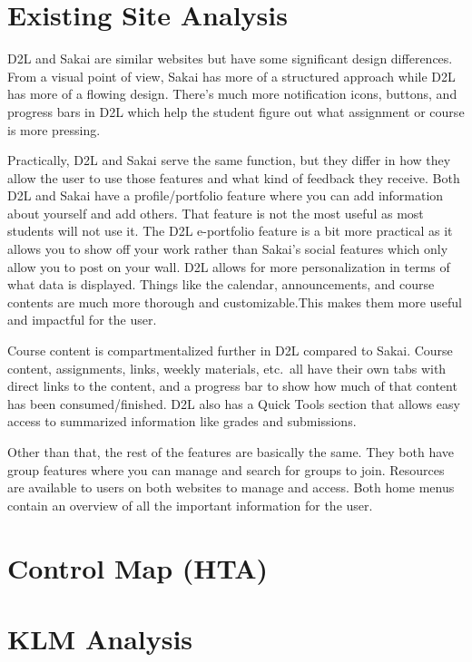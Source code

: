 \documentclass[12pt]{article}
\begin{document}
    \section{Existing Site Analysis}\label{sec:existing-site-analysis}

    D2L and Sakai are similar websites but have some significant design differences.
    From a visual point of view, Sakai has more of a structured approach while D2L has more of a flowing design.
    There’s much more notification icons, buttons, and progress bars in D2L which help the student figure out what assignment or course is more pressing.

    Practically, D2L and Sakai serve the same function, but they differ in how they allow the user to use those features and what kind of feedback they receive.
    Both D2L and Sakai have a profile/portfolio feature where you can add information about yourself and add others.
    That feature is not the most useful as most students will not use it.
    The D2L e-portfolio feature is a bit more practical as it allows you to show off your work rather than Sakai’s social features which only allow you to post on your wall.
    D2L allows for more personalization in terms of what data is displayed.
    Things like the calendar, announcements, and course contents are much more thorough and customizable.This makes them more useful and impactful for the user.

    Course content is compartmentalized further in D2L compared to Sakai.
    Course content, assignments, links, weekly materials, etc.\ all have their own tabs with direct links to the content, and a progress bar to show how much of that content has been consumed/finished.
    D2L also has a Quick Tools section that allows easy access to summarized information like grades and submissions.

    Other than that, the rest of the features are basically the same.
    They both have group features where you can manage and search for groups to join.
    Resources are available to users on both websites to manage and access.
    Both home menus contain an overview of all the important information for the user.


    \section{Control Map (HTA)}\label{sec:control-maphta}



    \section{KLM Analysis}\label{sec:klm-analysis}
\end{document}

